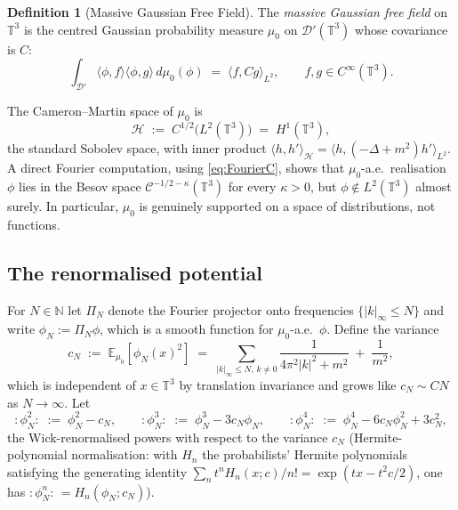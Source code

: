 \documentclass[12pt]{article}
\theoremstyle{definition}
\newtheorem{definition}[theorem]{Definition}
\begin{document}
\begin{definition}[Massive Gaussian Free Field]\label{def:GFF}
The \emph{massive Gaussian free field} on $\mathbb{T}^3$ is the centred Gaussian probability
measure $\mu_0$ on $\mathcal{D}'(\mathbb{T}^3)$ whose covariance is $C$:
\begin{equation}\label{eq:GFFcov}
\int_{\mathcal{D}'} \langle\phi,f\rangle\langle\phi,g\rangle\,d\mu_0(\phi) \;=\; \langle f, Cg\rangle_{L^2},\qquad f,g\in C^\infty(\mathbb{T}^3).
\end{equation}
\end{definition}

The Cameron--Martin space of $\mu_0$ is
\begin{equation}\label{eq:CMspace}
\mathcal{H} \;:=\; C^{1/2}\bigl(L^2(\mathbb{T}^3)\bigr)
\;=\; H^1(\mathbb{T}^3),
\end{equation}
the standard Sobolev space, with inner product
$\langle h,h'\rangle_{\mathcal{H}}=\langle h,(-\Delta+m^2)h'\rangle_{L^2}$. A direct Fourier
computation, using \eqref{eq:FourierC}, shows that $\mu_0$-a.e.\ realisation $\phi$ lies in
the Besov space $\mathcal{C}^{-1/2-\kappa}(\mathbb{T}^3)$ for every $\kappa>0$, but
$\phi\notin L^2(\mathbb{T}^3)$ almost surely. In particular, $\mu_0$ is genuinely supported
on a space of distributions, not functions.

\subsection{The renormalised potential}

For $N\in\mathbb{N}$ let $\Pi_N$ denote the Fourier projector onto frequencies
$\{|k|_\infty\le N\}$ and write $\phi_N := \Pi_N\phi$, which is a smooth function for
$\mu_0$-a.e.\ $\phi$. Define the variance
\begin{equation}\label{eq:CN}
c_N \;:=\; \mathbb{E}_{\mu_0}[\phi_N(x)^2] \;=\; \sum_{|k|_\infty\le N,\,k\ne0}\frac{1}{4\pi^2|k|^2+m^2} \;+\; \frac{1}{m^2},
\end{equation}
which is independent of $x\in\mathbb{T}^3$ by translation invariance and grows like
$c_N\sim CN$ as $N\to\infty$. Let
\begin{equation}\label{eq:Wick}
\colon\!\phi_N^2\!\colon\;:=\;\phi_N^2-c_N,\qquad
\colon\!\phi_N^3\!\colon\;:=\;\phi_N^3-3c_N\phi_N,\qquad
\colon\!\phi_N^4\!\colon\;:=\;\phi_N^4-6c_N\phi_N^2+3c_N^2,
\end{equation}
the Wick-renormalised powers with respect to the variance $c_N$
(Hermite-polynomial normalisation: with $H_n$ the probabilists' Hermite polynomials
satisfying the generating identity $\sum_n t^n H_n(x;c)/n!=\exp(tx-t^2c/2)$, one has
$\colon\!\phi_N^n\!\colon\,=H_n(\phi_N;c_N)$).
\end{document}
